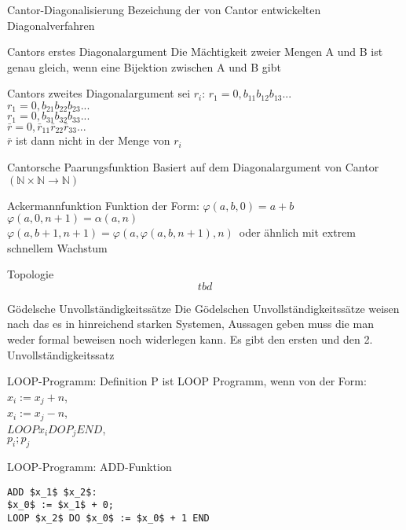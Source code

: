 \documentclass[a7paper,print,grid=both]{kartei}
\begin{document}
\begin{karte}{Cantor-Diagonalisierung}
Bezeichung der von Cantor entwickelten Diagonalverfahren
\end{karte}
\begin{karte}{Cantors erstes Diagonalargument}
Die Mächtigkeit zweier Mengen A und B ist genau gleich, wenn  eine Bijektion zwischen A und B gibt
\end{karte}
\begin{karte}{Cantors zweites Diagonalargument}
sei $r_i$: $r_1=0,b_{11}b_{12}b_{13}...$\\$r_1=0,b_{21}b_{22}b_{23}...$\\$r_1=0,b_{31}b_{32}b_{33}...$\\$\bar{r}=0,\bar{r}_{11}\bar{r}_{22}\bar{r}_{33}...$\\$\bar{r}$ ist dann nicht in der Menge von $r_i$
\end{karte}
\begin{karte}{Cantorsche Paarungsfunktion}
Basiert auf dem Diagonalargument von Cantor $(\mathbb{N}\times\mathbb{N}\to\mathbb{N})$
\end{karte}
\begin{karte}{Ackermannfunktion}
Funktion der Form: $\varphi(a, b, 0)=a+b\,$\\$\varphi(a, 0, n+1)=\alpha(a, n)\,$\\$\varphi(a, b+1, n+1)=\varphi(a, \varphi(a, b, n+1), n)\,$ oder ähnlich mit extrem schnellem Wachstum
\end{karte}
\begin{karte}{Topologie}
\[tbd\]
\end{karte}
\begin{karte}{Gödelsche Unvollständigkeitssätze}
Die Gödelschen Unvollständigkeitssätze weisen nach das es in hinreichend starken Systemen, Aussagen geben muss die man weder formal beweisen noch widerlegen kann. Es gibt den ersten und den 2. Unvollständigkeitssatz
\end{karte}
\begin{karte}{LOOP-Programm: Definition}
P ist LOOP Programm, wenn von der Form:\\$x_i:=x_j+n$,\\$x_i:=x_j-n$,\\$LOOP x_i DO P_j END$,\\$p_i;p_j$
\end{karte}
\begin{karte}{LOOP-Programm: ADD-Funktion}
\begin{lstlisting}[mathescape=true]
ADD $x_1$ $x_2$:
$x_0$ := $x_1$ + 0;
LOOP $x_2$ DO $x_0$ := $x_0$ + 1 END
\end{lstlisting}
\end{karte}
\end{document}
